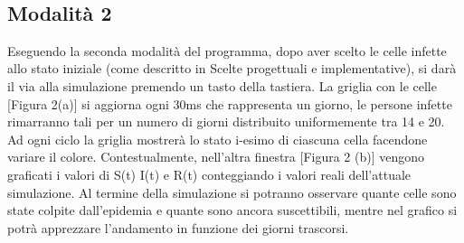 \documentclass[a4paper,10 pt]{article}
\begin{document}
\begin{figure}[h]
\centering
{} \quad {} \\
\caption{}
\label{fig:subfig}
\end{figure}


\subsection{Modalità 2}
Eseguendo la seconda modalità del programma, dopo aver scelto le celle infette allo stato iniziale (come descritto in Scelte progettuali e implementative), si darà il via alla simulazione premendo un tasto della tastiera. La griglia con le celle [Figura 2(a)] si aggiorna ogni 30ms che rappresenta un giorno, le persone infette rimarranno tali per un numero di giorni distribuito uniformemente tra 14 e 20. Ad ogni ciclo la griglia mostrerà lo stato i-esimo di ciascuna cella facendone variare il colore. Contestualmente, nell'altra finestra [Figura 2 (b)] vengono graficati i valori di S(t) I(t) e R(t) conteggiando i valori reali dell'attuale simulazione. Al termine della simulazione si potranno osservare quante celle sono state colpite dall'epidemia e quante sono ancora suscettibili, mentre nel grafico si potrà apprezzare l'andamento in funzione dei giorni trascorsi.
\end{document}
